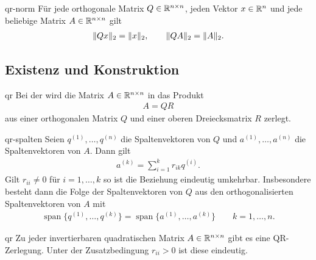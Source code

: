 \begin{Lemma}{qr-norm}
  Für jede orthogonale Matrix $Q\in \mathbb R^{n\times n}$, jeden Vektor
  $x\in\mathbb R^n$ und jede beliebige Matrix $A\in \mathbb R^{n\times n}$ gilt
  \begin{gather}
    \lVert Qx\rVert_2 = \lVert x\rVert_2,
    \qquad \lVert QA\rVert_2 = \lVert A\rVert_2.
  \end{gather}
\end{Lemma}

\subsection{Existenz und Konstruktion}

\begin{Definition}{qr}
  Bei der  wird die Matrix $A\in \mathbb R^{n\times n}$
  in das Produkt
  \begin{gather}
    A = QR
  \end{gather}
  aus einer orthogonalen Matrix $Q$ und einer oberen Dreiecksmatrix
  $R$ zerlegt.
\end{Definition}

\begin{Lemma}{qr-spalten}
  Seien $q^{(1)},\dots,q^{(n)}$ die Spaltenvektoren von $Q$ und
  $a^{(1)},\dots,a^{(n)}$ die Spaltenvektoren von $A$.
  Dann gilt
  \begin{gather}
    \label{eq:qr:2}
    a^{(k)} = \sum_{i=1}^k r_{ik} q^{(i)}.
  \end{gather}
  Gilt $r_{ii}\neq 0$ für $i=1,\dots,k$ so ist die Beziehung eindeutig
  umkehrbar.  Insbesondere besteht dann die Folge der Spaltenvektoren von
  $Q$ aus den orthogonalisierten Spaltenvektoren von $A$ mit
  \begin{align}
    \operatorname{span}\bigl\{q^{(1)},\dots,q^{(k)}\bigr\}
    = \operatorname{span}\bigl\{a^{(1)},\dots,a^{(k)}\bigr\}
    \qquad k=1,\dots,n.
  \end{align}
\end{Lemma}

\begin{Satz}{qr}
  Zu jeder invertierbaren quadratischen Matrix $A\in \mathbb R^{n\times n}$
  gibt es eine QR-Zerlegung. Unter der Zusatzbedingung $r_{ii}>0$ ist
  diese eindeutig.
\end{Satz}

